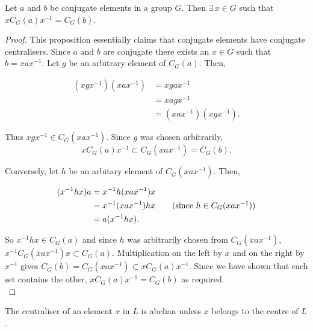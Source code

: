 \begin{proposition} \label{conjcent} Let $a$ and $b$ be conjugate elements in a group $G$. Then $\exists \, x \in G$ such that $xC_G(a)x^{-1} = C_G(b)$. \vspace{3mm}
\end{proposition}

\begin{proof}
This proposition essentially claims that conjugate elements have conjugate centralisers. Since $a$ and $b$ are conjugate there exists an $x \! \in \! G$ such that $b = xax^{-1}$. Let $g$ be an arbitrary element of $C_G(a)$. Then,

\begin{align*} (xgx^{-1})(xax^{-1}) &= xgax^{-1} \\
&= xagx^{-1} \tag{since $g \in C_G(a)$} \\
&= (xax^{-1})(xgx^{-1}). \end{align*}

Thus $xgx^{-1} \in C_G(xax^{-1})$. Since $g$ was chosen arbitrarily, $$xC_G(a)x^{-1} \subset C_G(xax^{-1}) = C_G(b).$$ 

Conversely, let $h$ be an arbitary element of $C_G(xax^{-1})$. Then,

\begin{align*} (x^{-1}hx)a &= x^{-1}h(xax^{-1})x \\
&= x^{-1}(xax^{-1})hx \tag{since $h \in C_G(xax^{-1})$} \\
&= a(x^{-1}hx). \end{align*}

So $x^{-1}hx \in C_G(a)$ and since $h$ was arbitrarily chosen from $C_G(xax^{-1})$, \linebreak $x^{-1}C_G(xax^{-1})x \subset C_G(a)$. Multiplication on the left by $x$ and on the right by $x^{-1}$ gives $C_G(b) =  C_G(xax^{-1}) \subset xC_G(a)x^{-1}$. Since we have shown that each set contains the other, $xC_G(a)x^{-1} = C_G(b)$ as required. \\
\end{proof}

\begin{corollary}\label{6.5}
The centraliser of an element $x$ in $L$ is abelian unless $x$ belongs to the centre of $L$. \vspace{3mm}
\end{corollary}

